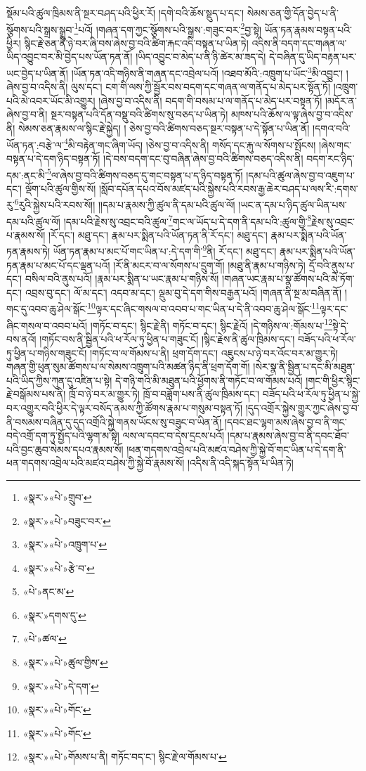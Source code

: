 སྡོམ་པའི་ཚུལ་ཁྲིམས་ནི་སྔར་བཤད་པའི་ཕྱིར་རོ། །དགེ་བའི་ཆོས་སྡུད་པ་དང་། སེམས་ཅན་གྱི་དོན་བྱེད་པ་ནི་སྩོགས་པའི་སྒྲས་སྒྲུབ་\footnote{«སྣར་»«པེ་»གྲུབ་}པའོ། །གཞན་དག་ཀྱང་སྩོགས་པའི་སྒྲས་:གཟུང་བར་\footnote{«སྣར་»«པེ་»བཟུང་བར་}བྱ་སྟེ། ཡོན་ཏན་རྣམས་བསྟན་པའི་ཕྱིར། སྙིང་རྗེ་ཅན་ནི་ཉེ་བར་ཞི་བས་ཞེས་བྱ་བའི་ཚིག་རྐང་འདི་བསྟན་པ་ཡིན་ཏེ། འདིས་ནི་བདག་དང་གཞན་ལ་ཡིད་འབྱུང་བར་མི་བྱེད་པས་ཡོན་ཏན་ནོ། །ཡིད་འབྱུང་བ་མེད་པ་ནི་ཉི་ཚེར་མ་ཟད་དེ། དེ་བཞིན་དུ་ཡིད་བརྟན་པར་ཡང་བྱེད་པ་ཡིན་ནོ། །ཡོན་ཏན་འདི་གཉིས་ནི་གཞན་དང་འབྲེལ་པའོ། །འཐབ་མོའི་:འཁྲུག་པ་ཡོང་\footnote{«སྣར་»«པེ་»འཁྲུག་པ་}མི་འབྱུང་། །ཞེས་བྱ་བ་འདིས་ནི། ལུས་དང་། ངག་གི་ལས་ཀྱི་སྦྱོར་བས་བདག་དང་གཞན་ལ་གནོད་པ་མེད་པར་སྟོན་ཏོ། །འཁྲུག་པའི་མེ་འབར་ཡོང་མི་འགྱུར། །ཞེས་བྱ་བ་འདིས་ནི། བདག་གི་བསམ་པ་ལ་གནོད་པ་མེད་པར་བསྟན་ཏོ། །མདོར་ན་ཞེས་བྱ་བ་ནི། སྔར་བསྟན་པའི་དོན་བསྡུ་བའི་ཚིགས་སུ་བཅད་པ་ཡིན་ཏེ། མཁས་པའི་ཆོས་ལ་ལྟ་ཞེས་བྱ་བ་འདིས་ནི། སེམས་ཅན་རྣམས་ལ་སྙིང་རྗེ་སྐྱེད། །
ཅེས་བྱ་བའི་ཚིགས་བཅད་སྔར་བསྟན་པ་དེ་སྟོན་པ་ཡིན་ནོ། །དགའ་བའི་ཡོན་ཏན་:བརྩེ་ལ་\footnote{«སྣར་»«པེ་»རྩེ་བ་}མི་བརྟེན་གང་ཞིག་ཡོད། །ཅེས་བྱ་བ་འདིས་ནི། གསོད་དང་རྐུ་ལ་སོགས་པ་སྤོངས། །ཞེས་གང་བསྟན་པ་དེ་དག་ཉིད་བསྟན་ཏོ། །དེ་བས་བདག་དང་བུ་བཞིན་ཞེས་བྱ་བའི་ཚིགས་བཅད་འདིས་ནི། བདག་རང་ཉིད་དམ་:ནང་མི་\footnote{«པེ་»ནང་མ་}ལ་ཞེས་བྱ་བའི་ཚིགས་བཅད་དུ་གང་བསྟན་པ་ད་ཉིད་བསྟན་ཏོ། །དམ་པའི་ཚུལ་ཞེས་བྱ་བ་འཇུག་པ་དང་། ལྡོག་པའི་ཚུལ་གྱིས་སོ། །སློབ་དཔོན་དཔའ་བོས་མཛད་པའི་སྐྱེས་པའི་རབས་རྒྱ་ཆེར་བཤད་པ་ལས་རི་:དགས་རུ་\footnote{«སྣར་»དགས་དུ་}རུའི་སྐྱེས་པའི་རབས་སོ།། །།དམ་པ་རྣམས་ཀྱི་ཚུལ་ནི་དམ་པའི་ཚུལ་ལོ། །ཡང་ན་དམ་པ་ཉིད་ཚུལ་ཡིན་པས་དམ་པའི་ཚུལ་ལོ། །དམ་པའི་རྗེས་སུ་འབྲང་བའི་ཚུལ་\footnote{«པེ་»ཚལ་}གང་ལ་ཡོད་པ་དེ་དག་ནི་དམ་པའི་:ཚུལ་གྱི་\footnote{«སྣར་»«པེ་»ཚུལ་གྱིས་}རྗེས་སུ་འབྲང་པ་རྣམས་སོ། །རོ་དང་། མཐུ་དང་། རྣམ་པར་སྨིན་པའི་ཡོན་ཏན་ནི་རོ་དང་། མཐུ་དང་། རྣམ་པར་སྨིན་པའི་ཡོན་ཏན་རྣམས་ཏེ། ཡོན་ཏན་རྣམ་པ་མང་པོ་གང་ཡིན་པ་:དེ་དག་གི་\footnote{«སྣར་»«པེ་»དེ་དག་}ནི། རོ་དང་། མཐུ་དང་། རྣམ་པར་སྨིན་པའི་ཡོན་ཏན་རྣམ་པ་མང་པོ་དང་ལྡན་པའོ། །རོ་ནི་མངར་བ་ལ་སོགས་པ་དྲུག་གོ། །མཐུ་ནི་རྣམ་པ་གཉིས་ཏེ། དྲོ་བའི་ནུས་པ་དང་། བསིལ་བའི་ནུས་པའོ། །རྣམ་པར་སྨིན་པ་ཡང་རྣམ་པ་གཉིས་སོ། །གཞན་ཡང་རྣམ་པ་སྣ་ཚོགས་པའི་མེ་ཏོག་དང་། འབྲས་བུ་དང་། ལོ་མ་དང་། འདབ་མ་དང་། ལྡུམ་བུ་དེ་དག་གིས་བརྒྱན་པའོ། །གཞན་ནི་སྔ་མ་བཞིན་ནོ། །གང་དུ་འབབ་ཆུ་ཤེལ་སྒོང་\footnote{«སྣར་»«པེ་»གོང་}ལྟར་དང་ཞིང་གསལ་བ་འབབ་པ་གང་ཡིན་པ་དེ་ནི་འབབ་ཆུ་ཤེལ་སྒོང་\footnote{«སྣར་»«པེ་»གོང་}ལྟར་དང་ཞིང་གསལ་བ་འབབ་པའོ། །གཏོང་བ་དང་། སྙིང་རྗེ་ནི། གཏོང་བ་དང་། སྙིང་རྗེའོ། །དེ་གཉིས་ལ་:གོམས་པ་\footnote{«སྣར་»«པེ་»གོམས་པ་ནི། གཏོང་བད་ང་། སྙིང་རྗེ་ལ་གོམས་པ་}སྟེ་དེ་བས་ནའོ། །གཏོང་བས་ནི་སྦྱིན་པའི་ཕ་རོལ་ཏུ་ཕྱིན་པ་གཟུང་ངོ། །སྙིང་རྗེས་ནི་ཚུལ་ཁྲིམས་དང་། བཟོད་པའི་ཕ་རོལ་ཏུ་ཕྱིན་པ་གཉིས་གཟུང་ངོ། །གཏོང་བ་ལ་གོམས་པ་ནི། ཕྲག་དོག་དང་། འཇུངས་པ་ཉེ་བར་འོང་བར་མ་གྱུར་ཏེ། གཞན་གྱི་ཕུན་སུམ་ཚོགས་པ་ལ་སེམས་འཁྲུག་པའི་མཚན་ཉིད་ནི་ཕྲག་དོག་གོ། །སེར་སྣ་ནི་སྦྱིན་པ་དང་མི་མཐུན་པའི་ཡིད་ཀྱིས་ཀུན་དུ་འཛིན་པ་སྟེ། དེ་གཉི་གའི་མི་མཐུན་པའི་ཕྱོགས་ནི་གཏོང་བ་ལ་གོམས་པའོ། །གང་གི་ཕྱིར་སྙིང་རྗེ་བསྒོམས་པས་ནི། ཁྲོ་བ་ཉེ་བར་མ་གྱུར་ཏེ། ཁྲོ་བ་བཟློག་པས་ནི་ཚུལ་ཁྲིམས་དང་། བཟོད་པའི་ཕ་རོལ་ཏུ་ཕྱིན་པ་སྐྱེ་བར་འགྱུར་བའི་ཕྱིར་དེ་ལྟར་བསོད་ནམས་ཀྱི་ཚོགས་རྣམ་པ་གསུམ་བསྟན་ཏོ། །དུད་འགྲོར་སྐྱེས་གྱུར་ཀྱང་ཞེས་བྱ་བ་ནི་བསམས་བཞིན་དུ་དུད་འགྲོའི་སྐྱེ་གནས་ཡོངས་སུ་བཟུང་བ་ཡིན་ནོ། །དབང་ཐང་ལྷག་མས་ཞེས་བྱ་བ་ནི་གང་བདེ་འགྲོ་དག་ཏུ་སྤྱོད་པའི་ལྷག་མ་སྟེ། ལས་ལ་དབང་བ་དེས་དྲངས་པའོ། །དམ་པ་རྣམས་ཞེས་བྱ་བ་ནི་དབང་ཐོབ་པའི་བྱང་ཆུབ་སེམས་དཔའ་རྣམས་སོ། །ཕན་གདགས་འབྲེལ་པའི་མཛའ་བཤེས་ཀྱི་སྐྱེ་བོ་གང་ཡིན་པ་དེ་དག་ནི་ཕན་གདགས་འབྲེལ་པའི་མཛའ་བཤེས་ཀྱི་སྐྱེ་བོ་རྣམས་སོ། །འདིས་ནི་འདི་སྐད་སྟོན་པ་ཡིན་ཏེ། 